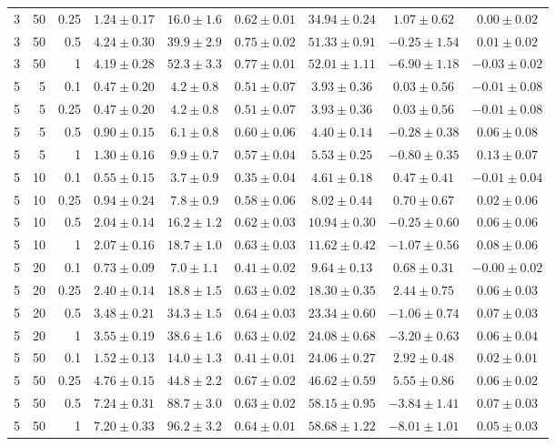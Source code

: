 \begin{table}[htbp]
\begin{tabular}{@{}rrrcccccc@{}}
3 & 50 & 0.25 & $1.24 \pm 0.17$ & $16.0 \pm 1.6$ & $0.62 \pm 0.01$ & $34.94 \pm 0.24$ & $1.07 \pm 0.62$ & $0.00 \pm 0.02$ \\
3 & 50 & 0.5 & $4.24 \pm 0.30$ & $39.9 \pm 2.9$ & $0.75 \pm 0.02$ & $51.33 \pm 0.91$ & $-0.25 \pm 1.54$ & $0.01 \pm 0.02$ \\
3 & 50 & 1 & $4.19 \pm 0.28$ & $52.3 \pm 3.3$ & $0.77 \pm 0.01$ & $52.01 \pm 1.11$ & $-6.90 \pm 1.18$ & $-0.03 \pm 0.02$ \\
\midrule
5 & 5 & 0.1 & $0.47 \pm 0.20$ & $4.2 \pm 0.8$ & $0.51 \pm 0.07$ & $3.93 \pm 0.36$ & $0.03 \pm 0.56$ & $-0.01 \pm 0.08$ \\
5 & 5 & 0.25 & $0.47 \pm 0.20$ & $4.2 \pm 0.8$ & $0.51 \pm 0.07$ & $3.93 \pm 0.36$ & $0.03 \pm 0.56$ & $-0.01 \pm 0.08$ \\
5 & 5 & 0.5 & $0.90 \pm 0.15$ & $6.1 \pm 0.8$ & $0.60 \pm 0.06$ & $4.40 \pm 0.14$ & $-0.28 \pm 0.38$ & $0.06 \pm 0.08$ \\
5 & 5 & 1 & $1.30 \pm 0.16$ & $9.9 \pm 0.7$ & $0.57 \pm 0.04$ & $5.53 \pm 0.25$ & $-0.80 \pm 0.35$ & $0.13 \pm 0.07$ \\
5 & 10 & 0.1 & $0.55 \pm 0.15$ & $3.7 \pm 0.9$ & $0.35 \pm 0.04$ & $4.61 \pm 0.18$ & $0.47 \pm 0.41$ & $-0.01 \pm 0.04$ \\
5 & 10 & 0.25 & $0.94 \pm 0.24$ & $7.8 \pm 0.9$ & $0.58 \pm 0.06$ & $8.02 \pm 0.44$ & $0.70 \pm 0.67$ & $0.02 \pm 0.06$ \\
5 & 10 & 0.5 & $2.04 \pm 0.14$ & $16.2 \pm 1.2$ & $0.62 \pm 0.03$ & $10.94 \pm 0.30$ & $-0.25 \pm 0.60$ & $0.06 \pm 0.06$ \\
5 & 10 & 1 & $2.07 \pm 0.16$ & $18.7 \pm 1.0$ & $0.63 \pm 0.03$ & $11.62 \pm 0.42$ & $-1.07 \pm 0.56$ & $0.08 \pm 0.06$ \\
5 & 20 & 0.1 & $0.73 \pm 0.09$ & $7.0 \pm 1.1$ & $0.41 \pm 0.02$ & $9.64 \pm 0.13$ & $0.68 \pm 0.31$ & $-0.00 \pm 0.02$ \\
5 & 20 & 0.25 & $2.40 \pm 0.14$ & $18.8 \pm 1.5$ & $0.63 \pm 0.02$ & $18.30 \pm 0.35$ & $2.44 \pm 0.75$ & $0.06 \pm 0.03$ \\
5 & 20 & 0.5 & $3.48 \pm 0.21$ & $34.3 \pm 1.5$ & $0.64 \pm 0.03$ & $23.34 \pm 0.60$ & $-1.06 \pm 0.74$ & $0.07 \pm 0.03$ \\
5 & 20 & 1 & $3.55 \pm 0.19$ & $38.6 \pm 1.6$ & $0.63 \pm 0.02$ & $24.08 \pm 0.68$ & $-3.20 \pm 0.63$ & $0.06 \pm 0.04$ \\
5 & 50 & 0.1 & $1.52 \pm 0.13$ & $14.0 \pm 1.3$ & $0.41 \pm 0.01$ & $24.06 \pm 0.27$ & $2.92 \pm 0.48$ & $0.02 \pm 0.01$ \\
5 & 50 & 0.25 & $4.76 \pm 0.15$ & $44.8 \pm 2.2$ & $0.67 \pm 0.02$ & $46.62 \pm 0.59$ & $5.55 \pm 0.86$ & $0.06 \pm 0.02$ \\
5 & 50 & 0.5 & $7.24 \pm 0.31$ & $88.7 \pm 3.0$ & $0.63 \pm 0.02$ & $58.15 \pm 0.95$ & $-3.84 \pm 1.41$ & $0.07 \pm 0.03$ \\
5 & 50 & 1 & $7.20 \pm 0.33$ & $96.2 \pm 3.2$ & $0.64 \pm 0.01$ & $58.68 \pm 1.22$ & $-8.01 \pm 1.01$ & $0.05 \pm 0.03$ \\
\bottomrule
\end{tabular}
\end{table}
